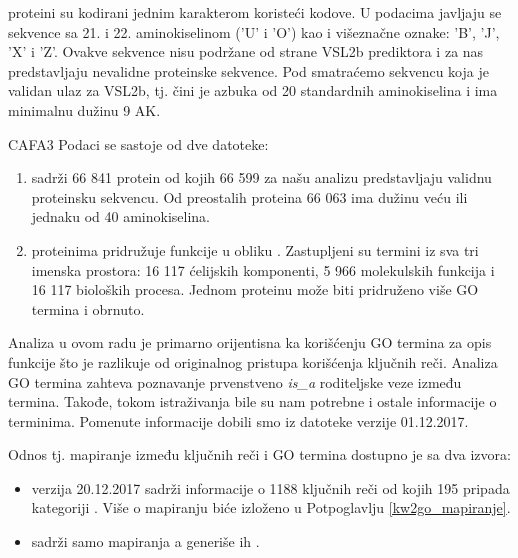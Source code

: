 
\swissprot proteini su kodirani jednim karakterom koristeći 
kodove.  U podacima javljaju se sekvence sa  21. i 22. aminokiselinom ('U' i 'O')
kao i  višeznačne oznake: 'B', 'J', 'X' i 'Z'.  Ovakve sekvence nisu podržane od
strane VSL2b prediktora i za nas predstavljaju nevalidne proteinske sekvence. Pod
 smatraćemo sekvencu koja je validan
ulaz za VSL2b, tj. čini je azbuka od 20 standardnih aminokiselina i
ima minimalnu dužinu 9 AK.

CAFA3 Podaci se sastoje od dve datoteke:
\begin{enumerate}
  \item {}  sadrži 66 841 protein od kojih 66 599
    za našu analizu predstavljaju validnu proteinsku sekvencu. Od preostalih
    proteina 66 063 ima dužinu veću ili jednaku od 40 aminokiselina.
  \item {} proteinima pridružuje funkcije u obliku 
    . Zastupljeni su termini iz sva tri imenska prostora:
    16 117 ćelijskih komponenti, 5 966 molekulskih funkcija i 16 117 bioloških
    procesa. Jednom proteinu može biti pridruženo više GO termina i obrnuto.
\end{enumerate}

Analiza u ovom radu je primarno orijentisna ka korišćenju GO termina za opis
funkcije što je razlikuje od originalnog pristupa korišćenja ključnih reči.
Analiza GO termina zahteva poznavanje prvenstveno \textit{is\_a} roditeljske
veze između termina. Takođe, tokom istraživanja bile su nam potrebne i ostale
informacije o terminima. Pomenute informacije dobili smo iz datoteke
 \cite{go_obo} verzije 01.12.2017.

Odnos tj. mapiranje između ključnih reči i GO termina dostupno je sa dva izvora:
\begin{itemize}
  \item {}\cite{keywlist_txt} verzija 20.12.2017 sadrži
    informacije o 1188 ključnih reči od kojih 195 pripada kategoriji
    . Više o mapiranju biće
    izloženo u Potpoglavlju \ref{kw2go_mapiranje}.
  \item {}\cite{uniprotkb_kw2go} sadrži samo mapiranja a
    generiše ih  \parencite{Barrell2009}. 
\end{itemize}

